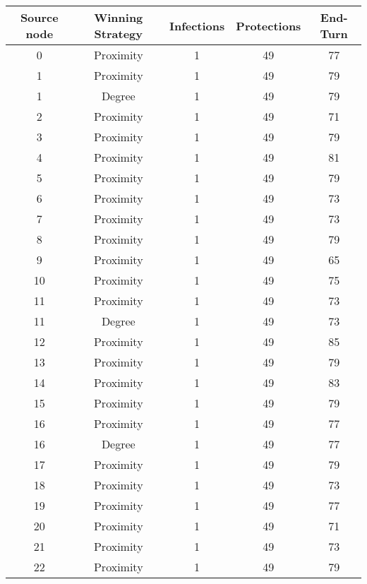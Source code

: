 \documentclass[results.tex]{subfiles}
\begin{document}
\begin{center}
  \begin{tabular}{| c || c | c | c | c |}
    \hline
    {\bfseries Source node} & {\bfseries Winning Strategy} & {\bfseries Infections} & {\bfseries Protections} & {\bfseries End-Turn} \\  %
    \hline\hline
    0 & Proximity & 1 & 49 & 77 \\ 
    \hline
    1 & Proximity & 1 & 49 & 79 \\ 
    \hline
    1 & Degree & 1 & 49 & 79 \\ 
    \hline
    2 & Proximity & 1 & 49 & 71 \\ 
    \hline
    3 & Proximity & 1 & 49 & 79 \\ 
    \hline
    4 & Proximity & 1 & 49 & 81 \\ 
    \hline
    5 & Proximity & 1 & 49 & 79 \\ 
    \hline
    6 & Proximity & 1 & 49 & 73 \\ 
    \hline
    7 & Proximity & 1 & 49 & 73 \\ 
    \hline
    8 & Proximity & 1 & 49 & 79 \\ 
    \hline
    9 & Proximity & 1 & 49 & 65 \\ 
    \hline
    10 & Proximity & 1 & 49 & 75 \\ 
    \hline
    11 & Proximity & 1 & 49 & 73 \\ 
    \hline
    11 & Degree & 1 & 49 & 73 \\ 
    \hline
    12 & Proximity & 1 & 49 & 85 \\ 
    \hline
    13 & Proximity & 1 & 49 & 79 \\ 
    \hline
    14 & Proximity & 1 & 49 & 83 \\ 
    \hline
    15 & Proximity & 1 & 49 & 79 \\ 
    \hline
    16 & Proximity & 1 & 49 & 77 \\ 
    \hline
    16 & Degree & 1 & 49 & 77 \\ 
    \hline
    17 & Proximity & 1 & 49 & 79 \\ 
    \hline
    18 & Proximity & 1 & 49 & 73 \\ 
    \hline
    19 & Proximity & 1 & 49 & 77 \\ 
    \hline
    20 & Proximity & 1 & 49 & 71 \\ 
    \hline
    21 & Proximity & 1 & 49 & 73 \\ 
    \hline
    22 & Proximity & 1 & 49 & 79 \\ 

\end{tabular}
\end{center}
\end{document}
